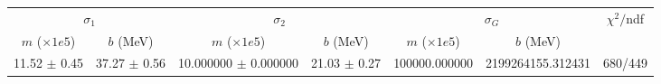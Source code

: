 \begin{tabular}{cc|cc|cc||c}
\multicolumn{2}{c|}{$\sigma_1$} & \multicolumn{2}{|c}{$\sigma_2$} & \multicolumn{2}{|c}{$\sigma_G$}  & \multirow{2}{*}{$\chi^2/$ndf}\\
$m$ ($\times1e5$) & $b$ (MeV) & $m$ ($\times1e5$) & $b$ (MeV) & $m$ ($\times1e5$) & $b$ (MeV) & \\
\hline
11.52 $\pm$ 0.45 & 37.27 $\pm$ 0.56 & 10.000000 $\pm$ 0.000000 & 21.03 $\pm$ 0.27 & 100000.000000 & 2199264155.312431 & 680/449\\
\end{tabular}
